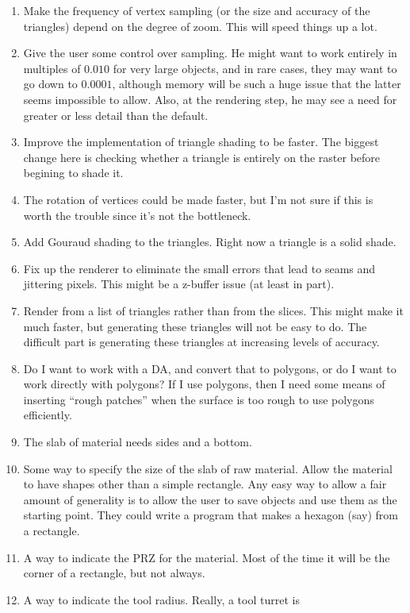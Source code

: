 \documentclass[titlepage,oneside,10pt]{article}
\begin{document}
\begin{enumerate}
\item Make the frequency of vertex sampling (or the size and accuracy
  of the triangles) depend on the degree of
  zoom. This will speed things up a lot.
\item Give the user some control over sampling. He might want to work
  entirely in multiples of $0.010$ for very large objects, and in rare
  cases, they may want to go down to $0.0001$, although memory will be
  such a huge issue that the latter seems impossible to allow. Also, at
  the rendering step, he may see a need for greater or less detail
  than the default.
\item Improve the implementation of triangle shading to be faster. The
  biggest change here is checking whether a triangle is entirely on
  the raster before begining to shade it.
\item The rotation of vertices could be made faster, but I'm not sure
  if this is worth the trouble since it's not the bottleneck.
\item Add Gouraud shading to the triangles. Right now a triangle is a
  solid shade.
\item Fix up the renderer to eliminate the small errors that lead to
  seams and jittering pixels. This might be a z-buffer issue (at least
  in part).
\item Render from a list of triangles rather than from the slices. This
  might make it much faster, but generating these triangles will not be
  easy to do. The difficult part is generating these triangles at
  increasing levels of accuracy.
\item Do I want to work with a DA, and convert that to polygons, or do
  I want to work directly with polygons? If I use polygons, then I
  need some means of inserting ``rough patches'' when the surface is
  too rough to use polygons efficiently.
\item The slab of material needs sides and a bottom.
\item Some way to specify the size of the slab of raw material. Allow
  the material to have shapes other than a simple rectangle. Any easy
  way to allow a fair amount of generality is to allow the user to
  save objects and use them as the starting point. They could write a
  program that makes a hexagon (say) from a rectangle.
\item A way to indicate the PRZ for the material. Most of the time it
  will be the corner of a rectangle, but not always.
\item A way to indicate the tool radius. Really, a tool turret is

\end{enumerate}
\end{document}
